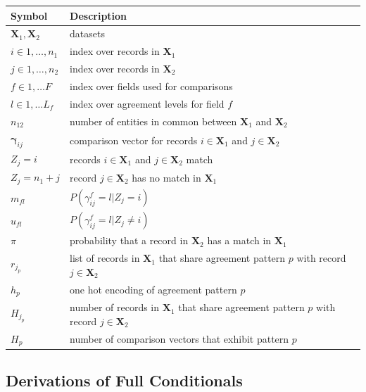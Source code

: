 \documentclass[ba]{imsart}
\begin{document}
		\begin{table}[h!]
		\centering
		\begin{tabular}[h!]{ll}
			\hline
			Symbol & Description \\
			\hline
			$\bm{X}_1, \bm{X}_2$ & datasets\\
			$i \in 1, \ldots, n_1 $ & index over records in $\bm{X}_1$\\
			$j \in 1, \ldots, n_2 $ & index over records in $\bm{X}_2$\\
			$f \in 1, \ldots F$ & index over fields used for comparisons \\
			$l \in 1, \ldots L_f$ & index over agreement levels for field $f$ \\
			$n_{12}$ & number of entities in common between $\bm{X}_1$ and $\bm{X}_2$\\
			$\bm{\gamma}_{ij}$ & comparison vector for records $i \in \bm{X}_1$ and $j \in \bm{X}_2$ \\
			$Z_j = i$ & records $i \in \bm{X}_1$ and $j \in \bm{X}_2$ match \\
			$Z_j = n_1 + j$ & record $j \in \bm{X}_2$ has no match in $\bm{X}_1$ \\
			$m_{fl}$ & $P(\gamma_{ij}^f = l | Z_j = i)$ \\
			$u_{fl}$ & $P(\gamma_{ij}^f = l | Z_j \neq i)$ \\
			$\pi$ & probability that a record in $\bm{X}_2$ has a match in $\bm{X}_1$ \\
			$r_{j_p}$ & list of records in $\bm{X}_1$ that share agreement pattern $p$ with record $j \in \bm{X}_2$ \\
			$h_p$ & one hot encoding of agreement pattern $p$ \\
			$H_{j_p}$ & number of records in $\bm{X}_1$ that share agreement pattern $p$ with record $j \in \bm{X}_2$ \\
			$H_p$ & number of comparison vectors that exhibit pattern $p$ \\
			\hline
		\end{tabular}
	\end{table}
	
	\hypertarget{app:derivations}{%
	\subsection{Derivations of Full Conditionals}\label{app:derivations}}
\end{document}
